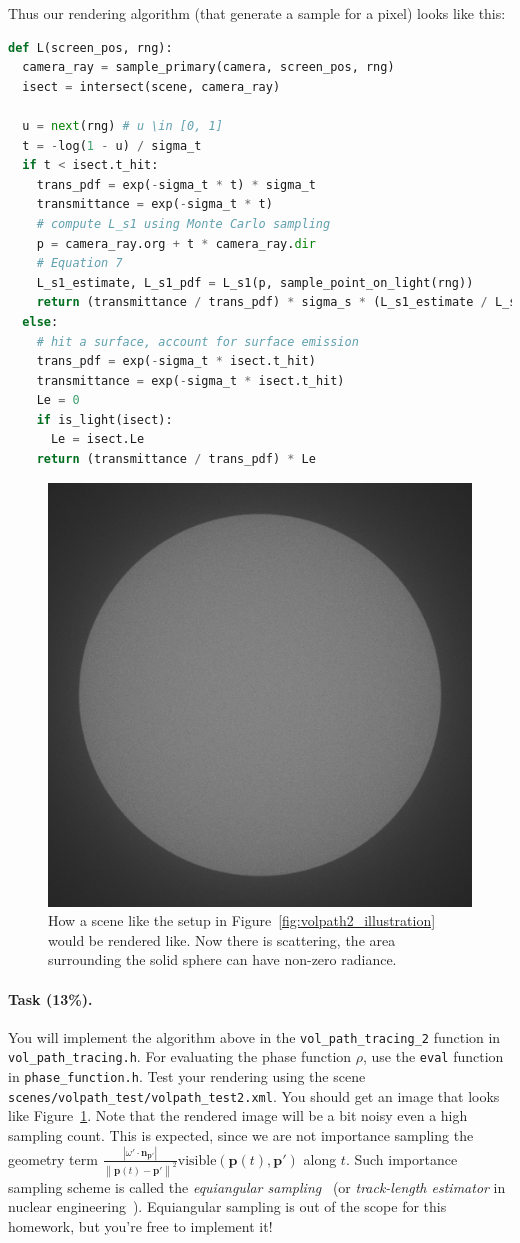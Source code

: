Thus our rendering algorithm (that generate a sample for a pixel) looks like this:
\begin{lstlisting}[language=python]
def L(screen_pos, rng):
  camera_ray = sample_primary(camera, screen_pos, rng)
  isect = intersect(scene, camera_ray)

  u = next(rng) # u \in [0, 1]
  t = -log(1 - u) / sigma_t
  if t < isect.t_hit:
    trans_pdf = exp(-sigma_t * t) * sigma_t
    transmittance = exp(-sigma_t * t)
    # compute L_s1 using Monte Carlo sampling
    p = camera_ray.org + t * camera_ray.dir
    # Equation 7
    L_s1_estimate, L_s1_pdf = L_s1(p, sample_point_on_light(rng))
    return (transmittance / trans_pdf) * sigma_s * (L_s1_estimate / L_s1_pdf)
  else:
    # hit a surface, account for surface emission
    trans_pdf = exp(-sigma_t * isect.t_hit)
    transmittance = exp(-sigma_t * isect.t_hit)
    Le = 0
    if is_light(isect):
      Le = isect.Le
    return (transmittance / trans_pdf) * Le
\end{lstlisting}

\begin{figure}
\centering
\includegraphics[width=0.5\linewidth]{imgs/volpath_2.png}
\caption{How a scene like the setup in Figure~\ref{fig:volpath2_illustration} would be rendered like. Now there is scattering, the area surrounding the solid sphere can have non-zero radiance.}
\label{fig:volpath2}
\end{figure}

\paragraph{Task (13\%).} You will implement the algorithm above in the \lstinline{vol_path_tracing_2} function in \lstinline{vol_path_tracing.h}. For evaluating the phase function $\rho$, use the \lstinline{eval} function in \lstinline{phase_function.h}.
Test your rendering using the scene \lstinline{scenes/volpath_test/volpath_test2.xml}. You should get an image that looks like Figure~\ref{fig:volpath2}. Note that the rendered image will be a bit noisy even a high sampling count. This is expected, since we are not importance sampling the geometry term $\frac{\left| \omega' \cdot \mathbf{n}_{\mathbf{p}'} \right|}{{\left\| \mathbf{p}(t) - \mathbf{p}' \right\|}^2} \text{visible}(\mathbf{p}(t), \mathbf{p}')$ along $t$. Such importance sampling scheme is called the \emph{equiangular sampling}~\cite{Kulla:2012:IST} (or \emph{track-length estimator} in nuclear engineering~\cite{Rief:1984:TLE}). Equiangular sampling is out of the scope for this homework, but you're free to implement it!

